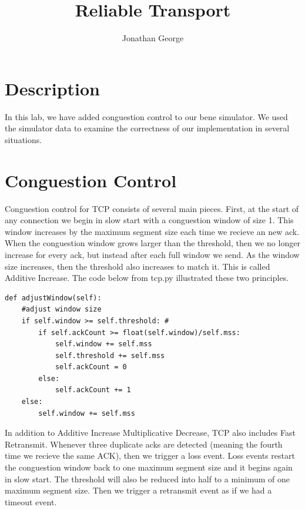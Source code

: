 \documentclass[11pt]{article}
\begin{document}
\lstset{
  language=Python,
  basicstyle=\small,          %
  keywordstyle=\bfseries,
  identifierstyle=,           %
  commentstyle=,              %
  stringstyle=\ttfamily,      %
  showstringspaces=false,     %
  numbers=left,
  numberstyle=\tiny,
  numbersep=5pt,
  frame=tb,
}

\title{Reliable Transport}

\author{Jonathan George}

\date{}

\maketitle

\section{Description}
In this lab, we have added conguestion control to our bene simulator. We used the simulator data to examine the correctness of our implementation in several situations.

\section{Conguestion Control}
Conguestion control for TCP consists of several main pieces. First, at the start of any connection we begin in slow start with a conguestion window of size 1. This window increases by the maximum segment size each time we recieve an new ack. When the conguestion window grows larger than the threshold, then we no longer increase for every ack, but instead after each full window we send. As the window size increases, then the threshold also increases to match it. This is called Additive Increase. The code below from tcp.py illustrated these two principles.

\begin{lstlisting}
def adjustWindow(self):
    #adjust window size
    if self.window >= self.threshold: #
        if self.ackCount >= float(self.window)/self.mss:
            self.window += self.mss
            self.threshold += self.mss
            self.ackCount = 0
        else:
            self.ackCount += 1
    else:
        self.window += self.mss
\end{lstlisting}

In addition to Additive Increase Multiplicative Decrease, TCP also includes Fast Retransmit. Whenever three duplicate acks are detected (meaning the fourth time we recieve the same ACK), then we trigger a loss event. Loss events restart the conguestion window back to one maximum segment size and it begins again in slow start. The threshold will also be reduced into half to a minimum of one maximum segment size. Then we trigger a retransmit event as if we had a timeout event. 
\end{document}
